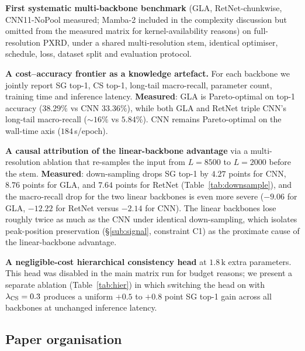 \documentclass[final]{ws-ijwmip}
\begin{document}
\begin{romanlist}[(iii)]
\item \textbf{First systematic multi-backbone benchmark} (GLA,
      RetNet-chunkwise, CNN11-NoPool measured; Mamba-2 included in the
      complexity discussion but omitted from the measured matrix
      for kernel-availability reasons) on full-resolution PXRD, under
      a shared multi-resolution stem, identical optimiser, schedule,
      loss, dataset split and evaluation protocol.
\item \textbf{A cost--accuracy frontier as a knowledge artefact.} For
      each backbone we jointly report SG top-1, CS top-1, long-tail
      macro-recall, parameter count, training time and inference
      latency. \textbf{Measured}: GLA is Pareto-optimal on top-1 accuracy
      ($38.29\%$ vs CNN $33.36\%$), while both GLA and RetNet triple
      CNN's long-tail macro-recall ($\sim 16\%$ vs $5.84\%$). CNN
      remains Pareto-optimal on the wall-time axis ($184$\,s/epoch).
\item \textbf{A causal attribution of the linear-backbone advantage} via
      a multi-resolution ablation that re-samples the input from
      $L=8500$ to $L=2000$ before the stem. \textbf{Measured}:
      down-sampling drops SG top-1 by $4.27$ points for CNN, $8.76$
      points for GLA, and $7.64$ points for RetNet (Table~\ref{tab:downsample}),
      and the macro-recall drop for the two linear backbones is even more
      severe ($-9.06$ for GLA, $-12.22$ for RetNet versus $-2.14$ for CNN).
      The linear backbones lose roughly twice as much as the CNN under
      identical down-sampling, which isolates peak-position preservation
      (\S\ref{sub:signal}, constraint C1) as the proximate cause of the
      linear-backbone advantage.
\item \textbf{A negligible-cost hierarchical consistency head} at
      $1.8\,\mathrm{k}$ extra parameters. This head was disabled in
      the main matrix run for budget reasons; we present a separate
      ablation (Table~\ref{tab:hier}) in which switching the head on
      with $\lambda_{\rm CS}=0.3$ produces a uniform $+0.5$ to
      $+0.8$ point SG top-1 gain across all backbones at unchanged
      inference latency.
\end{romanlist}


\subsection{Paper organisation}
\end{document}
